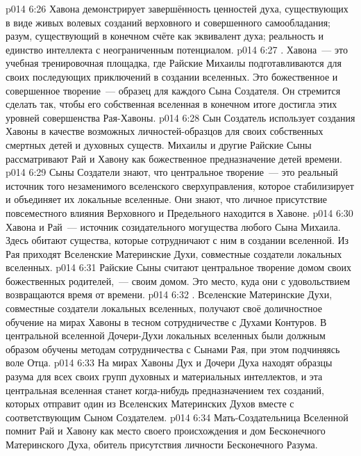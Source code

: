 \vs p014 6:26 Хавона демонстрирует завершённость ценностей духа, существующих в виде живых волевых созданий верховного и совершенного самообладания; разум, существующий в конечном счёте как эквивалент духа; реальность и единство интеллекта с неограниченным потенциалом.
\vs p014 6:27 . Хавона~--- это учебная тренировочная площадка, где Райские Михаилы подготавливаются для своих последующих приключений в создании вселенных. Это божественное и совершенное творение~--- образец для каждого Сына Создателя. Он стремится сделать так, чтобы его собственная вселенная в конечном итоге достигла этих уровней совершенства Рая\hyp{}Хавоны.
\vs p014 6:28 Сын Создатель использует создания Хавоны в качестве возможных личностей\hyp{}образцов для своих собственных смертных детей и духовных существ. Михаилы и другие Райские Сыны рассматривают Рай и Хавону как божественное предназначение детей времени.
\vs p014 6:29 Сыны Создатели знают, что центральное творение~--- это реальный источник того незаменимого вселенского сверхуправления, которое стабилизирует и объединяет их локальные вселенные. Они знают, что личное присутствие повсеместного влияния Верховного и Предельного находится в Хавоне.
\vs p014 6:30 Хавона и Рай~--- источник созидательного могущества любого Сына Михаила. Здесь обитают существа, которые сотрудничают с ним в создании вселенной. Из Рая приходят Вселенские Материнские Духи, совместные создатели локальных вселенных.
\vs p014 6:31 Райские Сыны считают центральное творение домом своих божественных родителей,~--- своим домом. Это место, куда они с удовольствием возвращаются время от времени.
\vs p014 6:32 . Вселенские Материнские Духи, совместные создатели локальных вселенных, получают своё доличностное обучение на мирах Хавоны в тесном сотрудничестве с Духами Контуров. В центральной вселенной Дочери\hyp{}Духи локальных вселенных были должным образом обучены методам сотрудничества с Сынами Рая, при этом подчиняясь воле Отца.
\vs p014 6:33 На мирах Хавоны Дух и Дочери Духа находят образцы разума для всех своих групп духовных и материальных интеллектов, и эта центральная вселенная станет когда\hyp{}нибудь предназначением тех созданий, которых отправит один из Вселенских Материнских Духов вместе с соответствующим Сыном Создателем.
\vs p014 6:34 Мать\hyp{}Создательница Вселенной помнит Рай и Хавону как место своего происхождения и дом Бесконечного Материнского Духа, обитель присутствия личности Бесконечного Разума.
